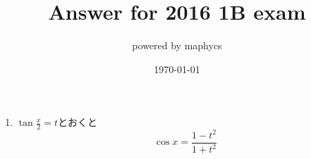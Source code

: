 \documentclass[a4paper,10pt,report]{jarticle}
\title{Answer for 2016 1B exam}
\date{\today}
\author{powered by maphycs}
\begin{document}
    \maketitle
    \begin{enumerate}
        \item \(\tan\frac{x}{2}=t\)とおくと
        \begin{equation}
            \cos{x}=\frac{1-t^{2}}{1+t^{2}}
        \end{equation}
    \end{enumerate}
\end{document}
